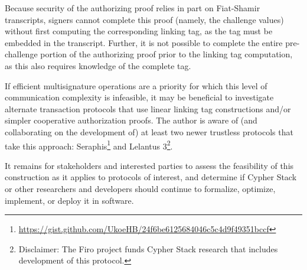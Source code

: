\documentclass{article}
\begin{document}
Because security of the authorizing proof relies in part on Fiat-Shamir transcripts, signers cannot complete this proof (namely, the challenge values) without first computing the corresponding linking tag, as the tag must be embedded in the transcript.
Further, it is not possible to complete the entire pre-challenge portion of the authorizing proof prior to the linking tag computation, as this also requires knowledge of the complete tag.

If efficient multisignature operations are a priority for which this level of communication complexity is infeasible, it may be beneficial to investigate alternate transaction protocols that use linear linking tag constructions and/or simpler cooperative authorization proofs.
The author is aware of (and collaborating on the development of) at least two newer trustless protocols that take this approach: Seraphis\footnote{\url{https://gist.github.com/UkoeHB/24f6be6125684046c5c4d9f49351bccf}} and Lelantus 3\footnote{Disclaimer: The Firo project funds Cypher Stack research that includes development of this protocol.}.

It remains for stakeholders and interested parties to assess the feasibility of this construction as it applies to protocols of interest, and determine if Cypher Stack or other researchers and developers should continue to formalize, optimize, implement, or deploy it in software.




\end{document}
